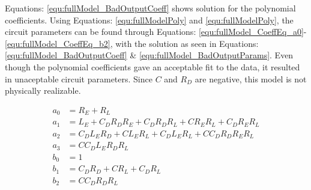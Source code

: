 

Equations: \eqref{equ:fullModel_BadOutputCoeff} shows solution for the polynomial coefficients. Using Equations: \eqref{equ:fullModelPoly} and \eqref{equ:fullModelPoly}, the circuit parameters can be found through Equations: \eqref{equ:fullModel_CoeffEq_a0}-\eqref{equ:fullModel_CoeffEq_b2}, with the solution as seen in Equations: \eqref{equ:fullModel_BadOutputCoeff} \& \eqref{equ:fullModel_BadOutputParams}.
Even though the polynomial coefficients gave an acceptable fit to the data, it resulted in unaceptable circuit parameters. Since $C$ and $R_D$ are negative, this model is not physically realizable.

\begin{align}
     a_0 &= R_E + R_L                                         \label{equ:fullModel_CoeffEq_a0} \\
     a_1 &= L_E + C_DR_DR_E + C_DR_DR_L + CR_ER_L + C_DR_ER_L \label{equ:fullModel_CoeffEq_a1} \\
     a_2 &= C_DL_ER_D + CL_ER_L + C_DL_ER_L + CC_DR_DR_ER_L   \label{equ:fullModel_CoeffEq_a2} \\
     a_3 &= CC_DL_ER_DR_L                                     \label{equ:fullModel_CoeffEq_a3} \\
     b_0 &= 1                                                 \label{equ:fullModel_CoeffEq_b0} \\
     b_1 &= C_DR_D + CR_L + C_DR_L                            \label{equ:fullModel_CoeffEq_b1} \\
     b_2 &= CC_DR_DR_L                                        \label{equ:fullModel_CoeffEq_b2}
\end{align}

